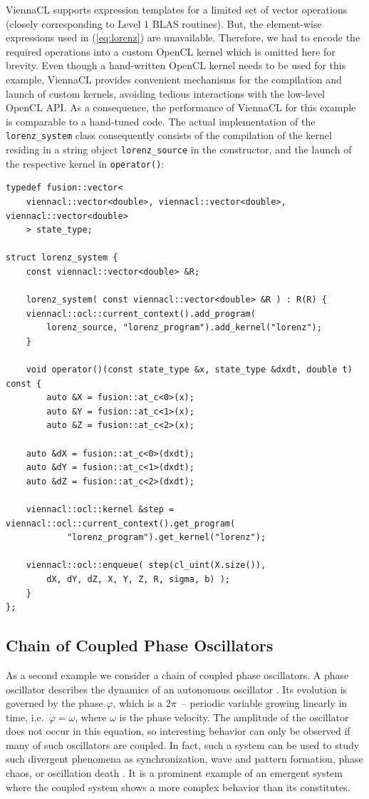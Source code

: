 \documentclass[final]{siamltex}
\newcommand{\code}[1]{\lstinline|#1|}
\newcommand{\eqref}[1]{(\ref{#1})}
\begin{document}
ViennaCL supports expression templates for a limited set of vector operations
(closely corresponding to Level 1 BLAS routines). But, the element-wise
expressions used in \eqref{eq:lorenz} are unavailable.  Therefore, we had to
encode the required operations into a custom OpenCL kernel which is omitted here
for brevity.  Even though a hand-written OpenCL kernel needs to be used for this
example, ViennaCL provides convenient mechanisms for the compilation and launch
of custom kernels, avoiding tedious interactions with the low-level OpenCL API.
As a consequence, the performance of ViennaCL for this example is comparable to
a hand-tuned code.  The actual implementation of the \code{lorenz_system} class
consequently consists of the compilation of the kernel residing in a string
object \code{lorenz_source} in the constructor, and the launch of the
respective kernel in \code{operator()}:
\begin{lstlisting}
typedef fusion::vector<
    viennacl::vector<double>, viennacl::vector<double>, viennacl::vector<double>
    > state_type;

struct lorenz_system {
    const viennacl::vector<double> &R;

    lorenz_system( const viennacl::vector<double> &R ) : R(R) {
	viennacl::ocl::current_context().add_program(
		lorenz_source, "lorenz_program").add_kernel("lorenz");
    }

    void operator()(const state_type &x, state_type &dxdt, double t) const {
        auto &X = fusion::at_c<0>(x);
        auto &Y = fusion::at_c<1>(x);
        auto &Z = fusion::at_c<2>(x);

	auto &dX = fusion::at_c<0>(dxdt);
	auto &dY = fusion::at_c<1>(dxdt);
	auto &dZ = fusion::at_c<2>(dxdt);

	viennacl::ocl::kernel &step = viennacl::ocl::current_context().get_program(
		    "lorenz_program").get_kernel("lorenz");

	viennacl::ocl::enqueue( step(cl_uint(X.size()),
	    dX, dY, dZ, X, Y, Z, R, sigma, b) );
    }
};
\end{lstlisting}



%
%
\subsection{Chain of Coupled Phase Oscillators}

As a second example we consider a chain of coupled phase
oscillators. A phase oscillator describes the dynamics of an
autonomous oscillator \cite{PhaseOscillator}. Its evolution is
governed by the phase $\varphi$, which is a $2\pi$~-- periodic variable growing linearly
in time, i.e.~$\dot{\varphi} = \omega$, where $\omega$ is the phase
velocity. The amplitude of the oscillator does not occur in this
equation, so interesting behavior can only be observed if many
of such oscillators are coupled. In fact, such a system can be used to
study such divergent phenomena as synchronization, wave and pattern
formation, phase chaos, or oscillation death
\cite{Synchronization-Pikovsky,Kuramoto-84}. It is a prominent example
of an emergent system where the coupled system shows a more complex
behavior than its constitutes.
\end{document}
